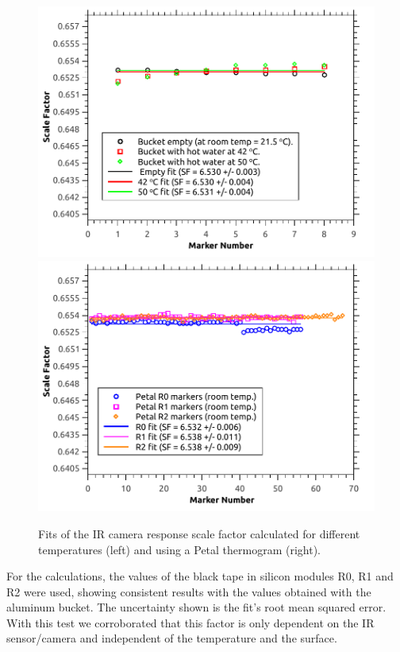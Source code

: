 		\begin{figure}[ht!]
			\centering
			\captionsetup{justification=centering,margin=2cm}
			\includegraphics[scale=0.5]{Figures/Chapter04/BucketScaleFactors.pdf}
			\includegraphics[scale=0.5]{Figures/Chapter04/PetalScaleFactors.pdf}
			\caption{Fits of the IR camera response scale factor calculated for different temperatures (left) and using a Petal thermogram (right).}\label{fig4.7}
		\end{figure}
		
		For the calculations, the values of the black tape in silicon modules R0, R1 and R2 were used, showing consistent results with the values obtained with the aluminum bucket. The uncertainty shown is the fit’s root mean squared error. With this test we corroborated that this factor is only dependent on the IR sensor/camera and independent of the temperature and the surface.\bigskip
		
